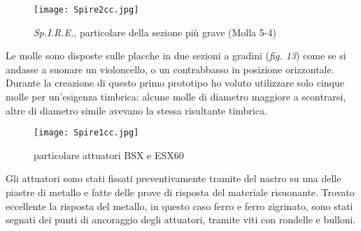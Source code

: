 \begin{figure}[htbp]
\begin{center}
\texttt{[image: Spire2cc.jpg]}
\caption{\textit{Sp.I.R.E.}, particolare della sezione più grave (Molla 5-4)}
\label{default}
\end{center}
\end{figure}

Le molle sono disposte sulle placche in due sezioni a gradini (\textit{fig. 13}) come se si andasse a suonare un violoncello, o un contrabbasso in posizione orizzontale. Durante la creazione di questo primo prototipo ho voluto utilizzare solo cinque molle per un'esigenza timbrica: alcune molle di diametro maggiore a scontrarsi, altre di diametro simile avevano la stessa risultante timbrica. 

\begin{figure}[t]
\begin{center}
\texttt{[image: Spire1cc.jpg]}
\caption{particolare attuatori BSX e ESX60}
\label{default}
\end{center}
\end{figure}

Gli attuatori sono stati fissati preventivamente tramite del nastro su una delle piastre di metallo e fatte delle prove di risposta del materiale risuonante. Trovato eccellente la risposta del metallo, in questo caso ferro e ferro zigrinato, sono stati segnati dei punti di ancoraggio degli attuatori, tramite viti con rondelle e bulloni.

